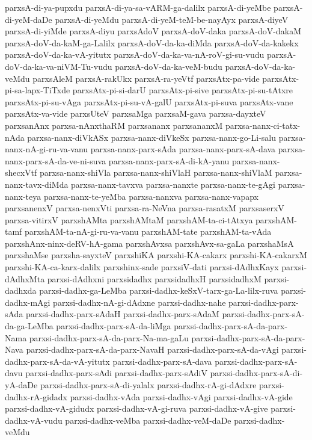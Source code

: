 {parxsA-di-ya-pupxdu
parxsA-di-ya-sa-vARM-ga-dalilx
parxsA-di-yeMbe
parxsA-di-yeM-daDe
parxsA-di-yeMdu
parxsA-di-yeM-teM-be-nayAyx
parxsA-diyeV
parxsA-di-yiMde
parxsA-diyu
parxsAdoV
parxsA-doV-daka
parxsA-doV-dakaM
parxsA-doV-da-kaM-ga-Lalilx
parxsA-doV-da-ka-diMda
parxsA-doV-da-kakekx
parxsA-doV-da-ka-vA-yitutx
parxsA-doV-da-ka-va-nA-roV-gi-su-vudu
parxsA-doV-da-ka-va-niVM-Tu-vudu
parxsA-doV-da-ka-veM-budu
parxsA-doV-da-ka-veMdu
parxsAleM
parxsA-rakUkx
parxsA-ra-yeVtf
parxsAtx-pa-vide
parxsAtx-pi-sa-lapx-TiTxde
parxsAtx-pi-si-darU
parxsAtx-pi-sive
parxsAtx-pi-su-tAtxre
parxsAtx-pi-su-vAga
parxsAtx-pi-su-vA-galU
parxsAtx-pi-suva
parxsAtx-vane
parxsAtx-va-vide
parxsUteV
parxsaMga
parxsaM-gava
parxsa-dayxteV
parxsanAnx
parxsa-nAnxthaRM
parxsananx
parxsananxM
parxsa-nanx-ci-tatx-nAda
parxsa-nanx-diVkASx
parxsa-nanx-diVkeSx
parxsa-nanx-go-Li-salu
parxsa-nanx-nA-gi-ru-va-vanu
parxsa-nanx-parx-sAda
parxsa-nanx-parx-sA-dava
parxsa-nanx-parx-sA-da-ve-ni-suva
parxsa-nanx-parx-sA-di-kA-yanu
parxsa-nanx-shecxVtf
parxsa-nanx-shiVla
parxsa-nanx-shiVlaH
parxsa-nanx-shiVlaM
parxsa-nanx-tavx-diMda
parxsa-nanx-tavxva
parxsa-nanxte
parxsa-nanx-te-gAgi
parxsa-nanx-teya
parxsa-nanx-te-yeMba
parxsa-nanxva
parxsa-nanx-vapapx
parxsanenxV
parxsa-nenxVti
parxsa-ra-NeVna
parxsa-rasatxM
parxsaserxV
parxsa-vitirxV
parxshAMta
parxshAMtaM
parxshAM-ta-ci-tAtxya
parxshAM-tamf
parxshAM-ta-nA-gi-ru-va-vanu
parxshAM-tate
parxshAM-ta-vAda
parxshAnx-ninx-deRV-hA-gama
parxshAvxsa
parxshAvx-sa-gaLa
parxshaMsA
parxshaMse
parxsha-sayxteV
parxshiKA
parxshi-KA-cakarx
parxshi-KA-cakarxM
parxshi-KA-ca-karx-dalilx
parxshinx-sade
parxsiV-dati
parxsi-dAdhxKayx
parxsi-dAdhxMta
parxsi-dAdhxni
parxsidadhx
parxsidadhxH
parxsidadhxM
parxsi-dadhxda
parxsi-dadhx-ga-LeMba
parxsi-dadhx-keSxV-tarx-ga-La-lilx-ruva
parxsi-dadhx-mAgi
parxsi-dadhx-nA-gi-dAdxne
parxsi-dadhx-nahe
parxsi-dadhx-parx-sAda
parxsi-dadhx-parx-sAdaH
parxsi-dadhx-parx-sAdaM
parxsi-dadhx-parx-sA-da-ga-LeMba
parxsi-dadhx-parx-sA-da-liMga
parxsi-dadhx-parx-sA-da-parx-Nama
parxsi-dadhx-parx-sA-da-parx-Na-ma-gaLu
parxsi-dadhx-parx-sA-da-parx-Nava
parxsi-dadhx-parx-sA-da-parx-NavaH
parxsi-dadhx-parx-sA-da-vAgi
parxsi-dadhx-parx-sA-da-vA-yitutx
parxsi-dadhx-parx-sA-dava
parxsi-dadhx-parx-sA-davu
parxsi-dadhx-parx-sAdi
parxsi-dadhx-parx-sAdiV
parxsi-dadhx-parx-sA-di-yA-daDe
parxsi-dadhx-parx-sA-di-yalalx
parxsi-dadhx-rA-gi-dAdxre
parxsi-dadhx-rA-gidadx
parxsi-dadhx-vAda
parxsi-dadhx-vAgi
parxsi-dadhx-vA-gide
parxsi-dadhx-vA-gidudx
parxsi-dadhx-vA-gi-ruva
parxsi-dadhx-vA-give
parxsi-dadhx-vA-vudu
parxsi-dadhx-veMba
parxsi-dadhx-veM-daDe
parxsi-dadhx-veMdu
}
